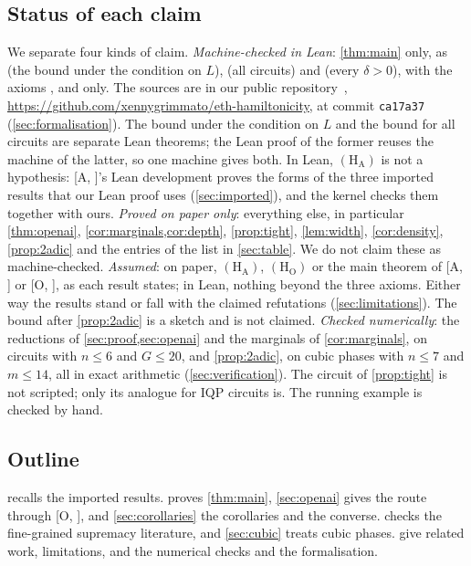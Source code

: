 \documentclass[10pt]{amsart}
\theoremstyle{plain}
\theoremstyle{definition}
\theoremstyle{remark}
\numberwithin{equation}{section}
\newcommand{\A}[1][]{\textup{[A\if\relax\detokenize{#1}\relax\else, #1\fi]}}
\newcommand{\Oa}[1][]{\textup{[O\if\relax\detokenize{#1}\relax\else, #1\fi]}}
\begin{document}
\subsection{Status of each claim}\label{sec:status}
We separate four kinds of claim.
\emph{Machine-checked in Lean}: \cref{thm:main} only, as 
(the bound under the condition on $L$),  (all circuits) and
 (every $\delta>0$), with the axioms ,
 and  only. The sources are in our public
repository~\cite{TulsyanRepo26}, \url{https://github.com/xennygrimmato/eth-hamiltonicity}, at commit
\texttt{ca17a37} (\cref{sec:formalisation}). The bound under the condition on $L$ and the bound for all circuits are
separate Lean theorems; the Lean proof of the former reuses the machine of the latter, so one machine
gives both. In Lean, $(\mathrm{H}_{\mathrm{A}})$ is not a
hypothesis: \A's Lean development proves the forms of the three imported results that our Lean proof
uses (\cref{sec:imported}), and the kernel checks them together with ours.
\emph{Proved on paper only}: everything else, in particular \cref{thm:openai},
\cref{cor:marginals,cor:depth}, \cref{prop:tight}, \cref{lem:width}, \cref{cor:density},
\cref{prop:2adic} and the entries of the list in \cref{sec:table}. We do not claim these as machine-checked.
\emph{Assumed}: on paper, $(\mathrm{H}_{\mathrm{A}})$, $(\mathrm{H}_{\mathrm{O}})$ or the main theorem
of \A{} or \Oa, as each result states; in Lean, nothing beyond the three axioms. Either way the results
stand or fall with the claimed refutations (\cref{sec:limitations}). The bound after
\cref{prop:2adic} is a sketch and is not claimed.
\emph{Checked numerically}: the reductions of \cref{sec:proof,sec:openai} and the marginals of
\cref{cor:marginals}, on circuits with $n\le6$ and $G\le20$, and \cref{prop:2adic}, on cubic
phases with $n\le7$ and $m\le14$, all in exact arithmetic (\cref{sec:verification}). The circuit of \cref{prop:tight} is not scripted; only its
analogue for IQP circuits is. The running example is checked by hand.

\subsection*{Outline}
 recalls the imported results.  proves \cref{thm:main},
\cref{sec:openai} gives the route through \Oa, and \cref{sec:corollaries} the corollaries and the
converse.  checks the fine-grained supremacy literature, and \cref{sec:cubic} treats
cubic phases.  give related work, limitations,
and the numerical checks and the formalisation.
\end{document}

